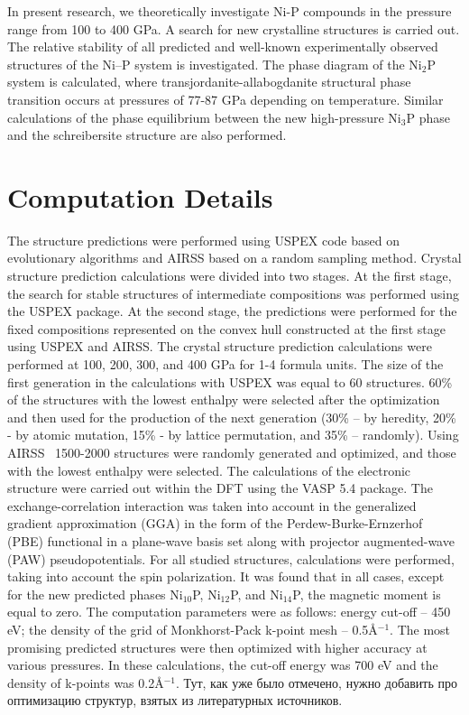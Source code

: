 \documentclass[twoside,twocolumn,9pt]{article}
\begin{document}
In present research, we theoretically investigate Ni-P compounds in the pressure range from 100 to 400 GPa. 
A search for new crystalline structures is carried out.
The relative stability of all predicted and well-known experimentally observed structures of the Ni--P system is investigated. 
The phase diagram of the Ni$_2$P system is calculated, where transjordanite-allabogdanite structural phase transition occurs at pressures of 77-87 GPa depending on temperature. 
Similar calculations of the phase equilibrium between the new high-pressure Ni$_3$P phase and the schreibersite structure are also performed.



   


\section{Computation Details}

The structure predictions were performed using USPEX code based on evolutionary algorithms \cite{USPEX-GLASS2006713, USPEX-OGANOV-2006, USPEX-LYAKHOV-2010-1623} and AIRSS based on
a random sampling method.\cite{AIRSS-PhysRevLett.97.045504, AIRSS-Pickard_2011} 
Crystal structure prediction calculations were divided into two stages. At the first stage, the search for stable structures of intermediate compositions was performed using the USPEX package. 
At the second stage, the predictions were performed for the fixed compositions represented on the convex hull constructed at the first stage using USPEX and AIRSS.
The crystal structure prediction calculations were performed at 100, 200, 300, and 400 GPa for 1-4 formula units. The size of the first generation in the calculations with USPEX was equal to 60 structures. 60\% of the structures with the lowest enthalpy were selected after the optimization and then used for the production of the next generation (30\% – by heredity, 20\% - by atomic mutation, 15\% - by lattice permutation, and 35\% – randomly). Using AIRSS ~1500-2000 structures were randomly generated and optimized, and those with the lowest enthalpy were selected.
The calculations of the electronic structure were carried out within the DFT using the VASP 5.4 package.\cite{VASP-1-PhysRevB.59.1758, VASP-2-PhysRevB.54.11169}
The exchange-correlation interaction was taken into account in the generalized  gradient approximation (GGA) in the form of the Perdew-Burke-Ernzerhof (PBE) functional \cite{PBE-PhysRevLett.78.1396} in a plane-wave basis set along with projector augmented-wave (PAW) pseudopotentials.\cite{PAW-PhysRevB.50.17953} 
For all studied structures, calculations were performed, taking into account the spin polarization. It was found that in all cases, except for the new predicted phases Ni$_{10}$P, Ni$_{12}$P, and Ni$_{14}$P, the magnetic moment is equal to zero. 
The computation parameters were as follows: energy cut-off -- 450 eV; the density of the grid of Monkhorst-Pack k-point mesh -- 0.5\AA$^{-1}$. 
The most promising predicted structures were then optimized with higher accuracy at various pressures. 
In these calculations, the cut-off energy was 700 eV and the density of k-points was 0.2\AA$^{-1}$. 
Тут, как уже было отмечено, нужно добавить про оптимизацию структур, взятых из литературных источников.
\end{document}
